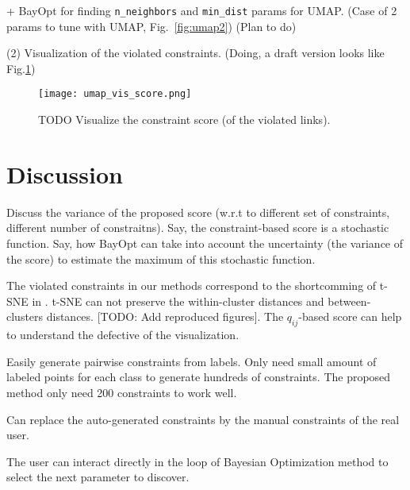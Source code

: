 + BayOpt for finding \verb|n_neighbors| and \verb|min_dist| params for UMAP. (Case of 2 params to tune with UMAP, Fig.~\ref{fig:umap2}) (Plan to do)
\begin{figure*}
\centering
\texttt{[image: \{demo\_bayopt\_2params]}.png}
\caption{TODO: Produce a figure similar to this one with 2 params of umap.}\label{fig:umap2}
\end{figure*}

\vspace{8pt} \par
(2) Visualization of the violated constraints. (Doing, a draft version looks like Fig.\ref{fig:viz-score})
\begin{figure}
\texttt{[image: umap\_vis\_score.png]}
\caption{TODO Visualize the constraint score (of the violated links).}\label{fig:viz-score}
\end{figure}


\section{Discussion}

\par
Discuss the variance of the proposed score (w.r.t to different set of constraints, different number of constraitns).
Say, the constraint-based score is a stochastic function.
Say, how BayOpt can take into account the uncertainty (the variance of the score) to estimate the maximum of this stochastic function.


\par
The violated constraints in our methods correspond to the shortcomming of t-SNE in \cite{wattenberg2016use}.
t-SNE can not preserve the within-cluster distances and between-clusters distances.
[TODO: Add reproduced figures].
The $q_{ij}$-based score can help to understand the defective of the visualization.

\par
Easily generate pairwise constraints from labels.
  Only need small amount of labeled points for each class to generate hundreds of constraints.
  The proposed method only need 200 constraints to work well.

\par
Can replace the auto-generated constraints by the manual constraints of the real user.

\par
The user can interact directly in the loop of Bayesian Optimization method to select the next parameter to discover.


